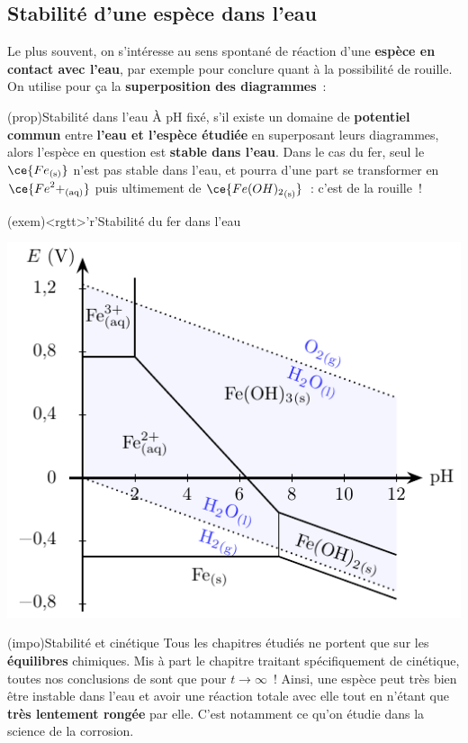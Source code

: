 \documentclass[../../main/main.tex]{subfiles}
\begin{document}
\subsection{Stabilité d'une espèce dans l'eau}
Le plus souvent, on s'intéresse au sens spontané de réaction d'une
\textbf{espèce en contact avec l'eau}, par exemple pour conclure quant à la
possibilité de rouille. On utilise pour ça la \textbf{superposition des
	diagrammes}~:
\begin{tcbraster}[raster equal height=rows, raster columns=2]
	\begin{tcb*}(prop){Stabilité dans l'eau}
		À pH fixé, s'il existe un domaine de \textbf{potentiel commun} entre
		\textbf{l'eau et l'espèce étudiée} en superposant leurs diagrammes, alors
		l'espèce en question est \textbf{stable dans l'eau}.
		\bigbreak
		Dans le cas du fer, seul le $\ce{Fe_{\rm(s)}}$ n'est pas stable dans l'eau,
		et pourra d'une part se transformer en $\ce{{Fe}^2+_{\rm(aq)}}$ puis
		ultimement de $\ce{{Fe(OH)_2}_{\rm(s)}}$~: c'est de la rouille~!
	\end{tcb*}
	\begin{tcb*}(exem)<rgtt>'r'{Stabilité du fer dans l'eau}
		\begin{center}
			\includegraphics[width=\linewidth]{eph_fer-eau}
		\end{center}
	\end{tcb*}
\end{tcbraster}

\begin{tcb*}(impo){Stabilité et cinétique}
	Tous les chapitres étudiés ne portent que sur les \textbf{équilibres}
	chimiques. Mis à part le chapitre traitant spécifiquement de cinétique, toutes
	nos conclusions de sont que pour $t \to \infty$~!
	\smallbreak
	Ainsi, une espèce peut très bien être instable dans l'eau et avoir une
	réaction totale avec elle tout en n'étant que \textbf{très lentement rongée}
	par elle. C'est notamment ce qu'on étudie dans la science de la corrosion.
\end{tcb*}
\end{document}
